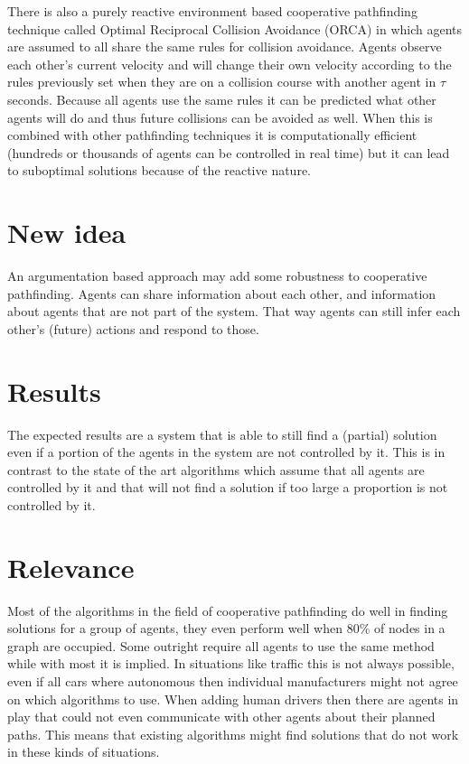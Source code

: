 \documentclass[a4paper]{article}
\begin{document}
There is also a purely reactive environment based cooperative pathfinding
technique called Optimal Reciprocal Collision Avoidance (ORCA) in which agents
are assumed to all share the same rules for collision avoidance. Agents observe
each other's current velocity and will change their own velocity according to
the rules previously set when they are on a collision course with another agent
in $\tau$ seconds. Because all agents use the same rules it can be predicted
what other agents will do and thus future collisions can be avoided as well.
When this is combined with other pathfinding techniques it is computationally
efficient (hundreds or thousands of agents can be controlled in real time) but
it can lead to suboptimal solutions because of the reactive nature.

\section*{New idea}
An argumentation based approach may add some robustness to cooperative
pathfinding. Agents can share information about each other, and information
about agents that are not part of the system. That way agents can still infer
each other's (future) actions and respond to those.

\section*{Results}
The expected results are a system that is able to still find a (partial)
solution even if a portion of the agents in the system are not controlled by
it. This is in contrast to the state of the art algorithms which assume that
all agents are controlled by it and that will not find a solution if too large a
proportion is not controlled by it.

\section*{Relevance}
Most of the algorithms in the field of cooperative pathfinding do well in
finding solutions for a group of agents, they even perform well when 80\% of
nodes in a graph are occupied. Some outright require all agents to use the same
method while with most it is implied. In situations like traffic this is not
always possible, even if all cars where autonomous then individual manufacturers
might not agree on which algorithms to use. When adding human drivers then there
are agents in play that could not even communicate with other agents about their
planned paths. This means that existing algorithms might find solutions that do
not work in these kinds of situations.
\end{document}
